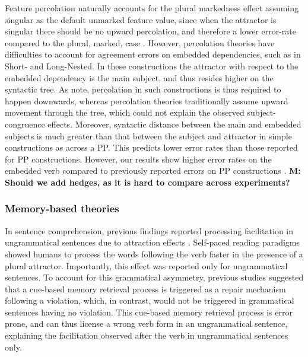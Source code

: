 Feature percolation naturally accounts for the plural markedness effect assuming singular as the default unmarked feature value,
since when the attractor is singular there should be no upward percolation, and therefore a lower error-rate compared to the plural, marked, case \citep{pearlmutter1999agreement}. However, percolation theories have difficulties to account for agreement errors on embedded dependencies, such as in Short- and Long-Nested. In these constructions the attractor with respect to the embedded dependency is the main subject, and thus resides higher on the syntactic tree. As \citet{wagers2009agreement} note, percolation in such constructions is thus required to happen downwards, whereas percolation theories traditionally assume upward movement through the tree, which could not explain the observed subject-congruence effects. Moreover, syntactic distance between the main and embedded subjects is much greater than that between the subject and attractor in simple constructions as across a PP. This predicts lower error rates than those reported for PP constructions. However, our results show higher error rates on the embedded verb compared to previously reported errors on PP constructions \citep{vigliocco1995constructing}. \textbf{M: Should we add hedges, as it is hard to compare across experiments?}

\subsubsection{Memory-based theories}
In sentence comprehension, previous findings reported processing facilitation in ungrammatical sentences due to attraction effects \citep[e.g., ][]{pearlmutter1999agreement, wagers2009agreement, lago2015agreement}. Self-paced reading paradigms showed humans to process the words following the verb faster in the presence of a plural attractor. Importantly, this effect was reported only for ungrammatical sentences. To account for this grammatical asymmetry, previous studies suggested that a cue-based memory retrieval process \citep{lewis2005activation} is triggered as a repair mechanism following a violation, which, in contrast, would not be triggered in grammatical sentences having no violation. This cue-based memory retrieval process is error prone, and can thus license a wrong verb form in an ungrammatical sentence, explaining the facilitation observed after the verb in ungrammatical sentences only. 


